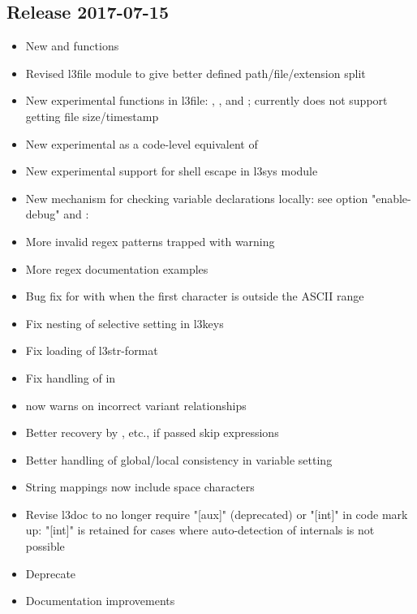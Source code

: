 \documentclass{ltnews}
\begin{document}
\subsection{Release 2017-07-15}

\begin{itemize}
\item New  and  functions
\item Revised l3file module to give better defined
  path/file/extension split
\item New experimental functions in l3file: ,
  ,  and
  ; currently  does not support
  getting file size/timestamp
\item New experimental  as a code-level
  equivalent of 
\item New experimental support for shell escape in l3sys module
\item New mechanism for checking variable declarations locally:
  see option "enable-debug" and
  :
\item More invalid regex patterns trapped with warning
\item More regex documentation examples
\item Bug fix for  with  when the first
  character is outside the ASCII range
\item Fix nesting of selective setting in l3keys
\end{itemize}

\begin{itemize}
 \item Fix loading of l3str-format
 \item Fix handling of  in 
 \item {} now warns on incorrect variant
   relationships
 \item Better recovery by , etc., if passed
   skip expressions
 \item Better handling of global/local consistency in variable
   setting
 \item String mappings now include space characters
 \item Revise l3doc to no longer require "[aux]" (deprecated) or
   "[int]" in code mark up: "[int]" is retained for cases where
   auto-detection of internals is not possible
 \item Deprecate 
 \item Documentation improvements
\end{itemize}
\end{document}
